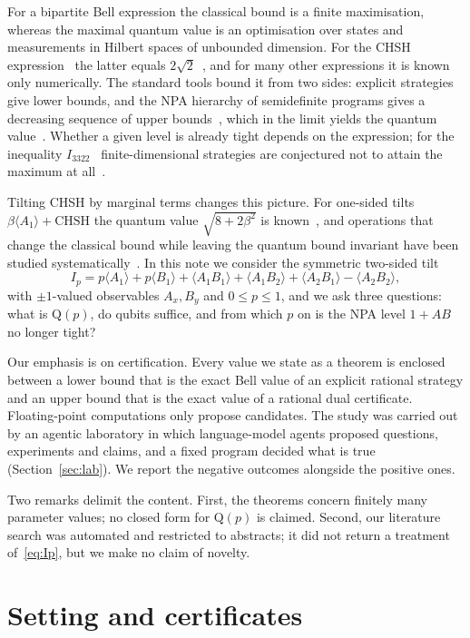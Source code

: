 \documentclass[10pt,twocolumn,a4paper]{article}
\theoremstyle{definition}
\theoremstyle{remark}
\newcommand{\Q}{\mathrm{Q}}
\newcommand{\ev}[1]{\langle #1\rangle}
\begin{document}
For a bipartite Bell expression the classical bound is a finite maximisation, whereas the maximal quantum value is an optimisation
over states and measurements in Hilbert spaces of unbounded dimension. For the CHSH expression~\cite{chsh} the latter equals
$2\sqrt2$~\cite{tsirelson}, and for many other expressions it is known only numerically. The standard tools bound it from two
sides: explicit strategies give lower bounds, and the NPA hierarchy of semidefinite programs gives a decreasing sequence of upper
bounds~\cite{npa07,npa08}, which in the limit yields the quantum value~\cite{avis}. Whether a given level is already tight
depends on the expression; for the inequality $I_{3322}$~\cite{cg} finite-dimensional strategies are conjectured not to attain the
maximum at all~\cite{pv}.

Tilting CHSH by marginal terms changes this picture. For one-sided tilts $\beta\ev{A_1}+\text{CHSH}$ the quantum value
$\sqrt{8+2\beta^2}$ is known~\cite{amp}, and operations that change the classical bound while leaving the quantum
bound invariant have been studied systematically~\cite{epping}. In this note we consider the symmetric two-sided tilt
\begin{equation}\label{eq:Ip}
I_p = p\ev{A_1} + p\ev{B_1} + \ev{A_1B_1}+\ev{A_1B_2}+\ev{A_2B_1}-\ev{A_2B_2},
\end{equation}
with $\pm1$-valued observables $A_x,B_y$ and $0\le p\le 1$, and we ask three questions: what is $\Q(p)$, do qubits suffice, and from
which $p$ on is the NPA level $1{+}AB$ no longer tight?

Our emphasis is on certification. Every value we state as a theorem is enclosed between a lower bound that is the exact Bell value
of an explicit rational strategy and an upper bound that is the exact value of a rational dual certificate. Floating-point
computations only propose candidates. The study was carried out by an agentic laboratory in which language-model agents proposed
questions, experiments and claims, and a fixed program decided what is true (Section~\ref{sec:lab}). We report the negative
outcomes alongside the positive ones.

Two remarks delimit the content. First, the theorems concern finitely many parameter values; no closed form for $\Q(p)$ is
claimed. Second, our literature search was automated and restricted to abstracts; it did not return a treatment of~\eqref{eq:Ip},
but we make no claim of novelty.

\section{Setting and certificates}\label{sec:setting}
\end{document}
